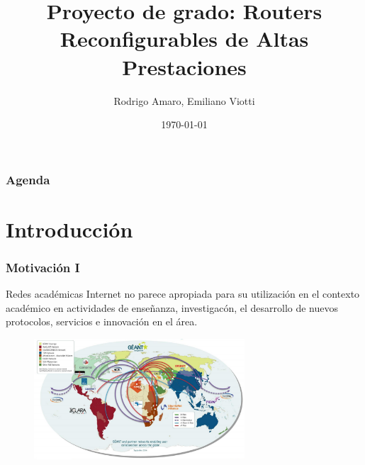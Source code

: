 \documentclass{beamer}
\title[RRAP]{Proyecto de grado: Routers Reconfigurables de Altas Prestaciones} %
\author{Rodrigo Amaro, Emiliano Viotti}
\institute[UdelaR] %
{
Instituto de Computaci\'on \\ Facultad de Ingeniería \\ Universidad de la República \\ \vspace{0.2cm} Tutores: Dr. Eduardo Gramp\'in, MSc. Mart\'in Giachino %
}
\date{\today} %
\begin{document}
\begin{frame}
\titlepage %
\end{frame}


\begin{frame}
\frametitle{Agenda} %
\tableofcontents %
\end{frame}




\section{Introducci\'on} 
\frame{\tableofcontents[currentsection]}

\begin{frame}
\frametitle{Motivaci\'on I} 

\begin{block}{Redes acad\'emicas}
Internet no parece apropiada para su utilizaci\'on en el contexto académico en actividades de enseñanza, investigac\'on, el desarrollo de nuevos protocolos, servicios e innovaci\'on en el \'area.
\end{block}

\begin{figure}[h] 
\centering    
\includegraphics[width=0.7\textwidth]{imagenes/redesAcademicas.png}
\label{fig:AcademicNetworks}
\end{figure}

\end{frame}
\end{document}
